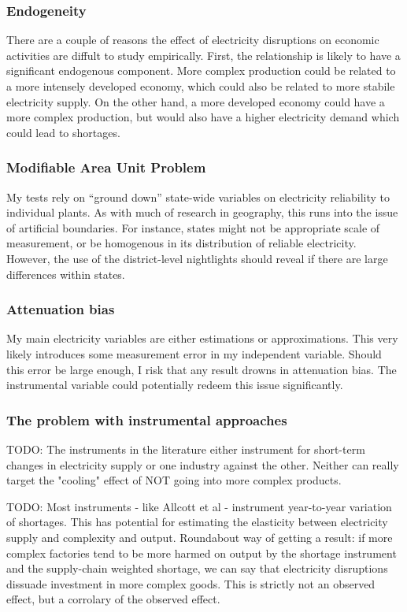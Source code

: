 \documentclass[11pt]{article}
\begin{document}
\subsubsection{Endogeneity}
\label{sec:orgd4457e7}
There are a couple of reasons the effect of electricity disruptions on economic activities are diffult to study empirically. First, the relationship is likely to have a significant endogenous component. More complex production could be related to a more intensely developed economy, which could also be related to more stabile electricity supply. On the other hand, a more developed economy could have a more complex production, but would also have a higher electricity demand which could lead to shortages.

\subsubsection{Modifiable Area Unit Problem}
\label{sec:org4e3cc26}
My tests rely on ``ground down'' state-wide variables on electricity reliability to individual plants. As with much of research in geography, this runs into the issue of artificial boundaries. For instance, states might not be appropriate scale of measurement, or be homogenous in its distribution of reliable electricity. However, the use of the district-level nightlights should reveal if there are large differences within states.

\subsubsection{Attenuation bias}
\label{sec:orge917ac0}
My main electricity variables are either estimations or approximations. This very likely introduces some measurement error in my independent variable. Should this error be large enough, I risk that any result drowns in attenuation bias. The instrumental variable could potentially redeem this issue significantly.

\subsubsection{The problem with instrumental approaches}
\label{sec:orge917ac0}

TODO: The instruments in the literature either instrument for short-term changes in electricity supply or one industry against the other. Neither can really target the "cooling" effect of NOT going into more complex products.

TODO: Most instruments - like Allcott et al - instrument year-to-year variation of shortages. This has potential for estimating the elasticity between electricity supply and complexity and output. Roundabout way of getting a result: if more complex factories tend to be more harmed on output by the shortage instrument and the supply-chain weighted shortage, we can say that electricity disruptions dissuade investment in more complex goods. This is strictly not an observed effect, but a corrolary of the observed effect.
\end{document}
